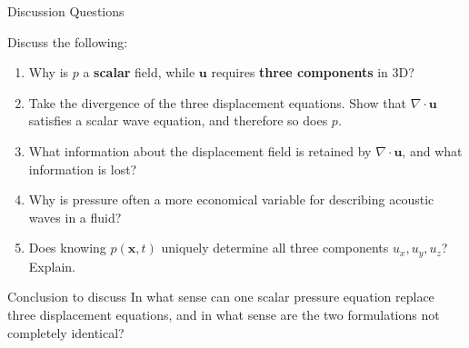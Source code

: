 \documentclass{beamer}
\begin{document}
\begin{frame}{Discussion Questions}
\small

Discuss the following:

\begin{enumerate}
    \item Why is \(p\) a \textbf{scalar} field, while \(\bm{u}\) requires \textbf{three components} in 3D?
    
    \vspace{0.15cm}
    
    \item Take the divergence of the three displacement equations. Show that \(\nabla\cdot\bm{u}\) satisfies a scalar wave equation, and therefore so does \(p\).
    
    \vspace{0.15cm}
    
    \item What information about the displacement field is retained by \(\nabla\cdot\bm{u}\), and what information is lost?
    
    \vspace{0.15cm}
    
    \item Why is pressure often a more economical variable for describing acoustic waves in a fluid?
    
    \vspace{0.15cm}
    
    \item Does knowing \(p(\bm{x},t)\) uniquely determine all three components \(u_x,u_y,u_z\)? Explain.
\end{enumerate}

\vspace{0.25cm}

\begin{block}{Conclusion to discuss}
In what sense can one scalar pressure equation replace three displacement equations, and in what sense are the two formulations not completely identical?
\end{block}

\end{frame}
\end{document}
